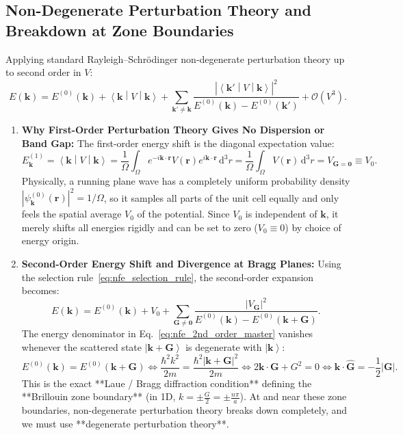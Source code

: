 \documentclass[11pt,a4paper]{article}
\newcommand{\ket}[1]{\left|#1\right\rangle}
\newcommand{\mel}[3]{\left\langle #1 \middle| #2 \middle| #3 \right\rangle}
\newcommand{\abs}[1]{\left|#1\right|}
\newcommand{\vb}[1]{\mathbf{#1}}
\newcommand{\hb}{\hbar}
\newcommand{\hbarsq}{\hb^2}
\newcommand{\dd}{\mathrm{d}}
\newcommand{\kk}{\mathbf{k}}
\newcommand{\kpvec}{\mathbf{k}'}
\newcommand{\GG}{\mathbf{G}}
\newcommand{\rvec}{\mathbf{r}}
\newcommand{\Ebare}{E^{(0)}}
\begin{document}
\subsection{Non-Degenerate Perturbation Theory and Breakdown at Zone Boundaries}
Applying standard Rayleigh--Schr\"odinger non-degenerate perturbation theory up to second order in $V$:
\begin{equation}
    E(\kk) = \Ebare(\kk) + \mel{\kk}{V}{\kk} + \sum_{\kpvec \neq \kk} \frac{\abs{\mel{\kpvec}{V}{\kk}}^2}{\Ebare(\kk) - \Ebare(\kpvec)} + \mathcal{O}(V^3).
\end{equation}
\begin{enumerate}
    \item \textbf{Why First-Order Perturbation Theory Gives No Dispersion or Band Gap:}
    The first-order energy shift is the diagonal expectation value:
    \begin{equation}
        E_{\kk}^{(1)} = \mel{\kk}{V}{\kk} = \frac{1}{\Omega}\int_{\Omega} e^{-i\kk\cdot\rvec} V(\rvec) e^{i\kk\cdot\rvec}\,\dd^3 r = \frac{1}{\Omega}\int_{\Omega} V(\rvec)\,\dd^3 r = V_{\GG=\vb{0}} \equiv V_0.
    \end{equation}
    Physically, a running plane wave has a completely uniform probability density $\abs{\psi_{\kk}^{(0)}(\rvec)}^2 = 1/\Omega$, so it samples all parts of the unit cell equally and only feels the spatial average $V_0$ of the potential. Since $V_0$ is independent of $\kk$, it merely shifts all energies rigidly and can be set to zero ($V_0 \equiv 0$) by choice of energy origin.
    \item \textbf{Second-Order Energy Shift and Divergence at Bragg Planes:}
    Using the selection rule~\eqref{eq:nfe_selection_rule}, the second-order expansion becomes:
    \begin{equation}
        \boxed{E(\kk) = \Ebare(\kk) + V_0 + \sum_{\GG \neq \vb{0}} \frac{\abs{V_{\GG}}^2}{\Ebare(\kk) - \Ebare(\kk+\GG)}.}
        \label{eq:nfe_2nd_order_master}
    \end{equation}
    The energy denominator in Eq.~\eqref{eq:nfe_2nd_order_master} vanishes whenever the scattered state $\ket{\kk+\GG}$ is degenerate with $\ket{\kk}$:
    \begin{equation}
        \Ebare(\kk) = \Ebare(\kk+\GG) \iff \frac{\hbarsq k^2}{2m} = \frac{\hbarsq \abs{\kk+\GG}^2}{2m} \iff 2\kk\cdot\GG + G^2 = 0 \iff \kk\cdot\hat{\GG} = -\frac{1}{2}\abs{\GG}.
    \end{equation}
    This is the exact **Laue / Bragg diffraction condition** defining the **Brillouin zone boundary** (in 1D, $k = \pm \frac{G}{2} = \pm \frac{n\pi}{a}$). At and near these zone boundaries, non-degenerate perturbation theory breaks down completely, and we must use **degenerate perturbation theory**.
\end{enumerate}
\end{document}
